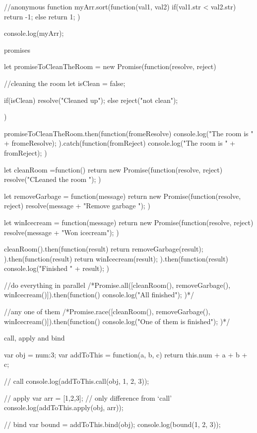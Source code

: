 \documentclass[a4paper,12pt]{article}
\begin{document}
\begin{description}
\begin{jscode}
//anonymous function
myArr.sort(function(val1, val2){
	if(val1.str < val2.str){
		return -1;
	}else{
		return 1;
	}
})

console.log(myArr);
\end{jscode}

\item promises
\begin{jscode}
let promiseToCleanTheRoom = new Promise(function(resolve, reject){
	//cleaning the room
	let isClean = false;

	if(isClean){
		resolve("Cleaned up");
	}else{
		reject("not clean");
	}
})

promiseToCleanTheRoom.then(function(fromeResolve){
	console.log("The room is " + fromeResolve);
}).catch(function(fromReject){
	console.log("The room is " + fromReject);
})
\end{jscode}
\begin{jscode}
let cleanRoom =function(){
	return new Promise(function(resolve, reject){
		resolve("CLeaned the room ");
	})
}

let removeGarbage = function(message){
	return new Promise(function(resolve, reject){
		resolve(message + "Remove garbage ");
	})
}

let winIcecream = function(message){
	return new Promise(function(resolve, reject){
		resolve(message + "Won icecream");
	})
}

cleanRoom().then(function(result){
	return removeGarbage(result);
}).then(function(result){
	return winIcecream(result);
}).then(function(result){
	console.log("Finished " + result);
})

//do everything in parallel
/*Promise.all([cleanRoom(), removeGarbage(), winIcecream()]).then(function(){
	console.log("All finished");
})*/

//any one of them
/*Promise.race([cleanRoom(), removeGarbage(), winIcecream()]).then(function(){
	console.log("One of them is finished");
})*/
\end{jscode}

\item call, apply and bind
\begin{jscode}
var obj = {num:3};
var addToThis = function(a, b, c){
	return this.num + a + b + c;
}

// call
console.log(addToThis.call(obj, 1, 2, 3));

// apply
var arr = [1,2,3]; // only difference from `call'
console.log(addToThis.apply(obj, arr));

// bind
var bound = addToThis.bind(obj);
console.log(bound(1, 2, 3));
\end{jscode}


\end{description}
\end{document}
